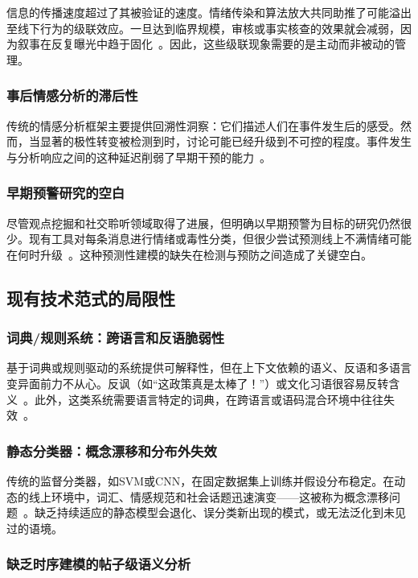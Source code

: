 \documentclass[conference]{IEEEtran}
\begin{document}
信息的传播速度超过了其被验证的速度。情绪传染和算法放大共同助推了可能溢出至线下行为的级联效应。一旦达到临界规模，审核或事实核查的效果就会减弱，因为叙事在反复曝光中趋于固化~\cite{Vosoughi2018}。因此，这些级联现象需要的是主动而非被动的管理。

\subsubsection{事后情感分析的滞后性}

传统的情感分析框架主要提供回溯性洞察：它们描述人们在事件发生后的感受。然而，当显著的极性转变被检测到时，讨论可能已经升级到不可控的程度。事件发生与分析响应之间的这种延迟削弱了早期干预的能力~\cite{Wang2020}。

\subsubsection{早期预警研究的空白}

尽管观点挖掘和社交聆听领域取得了进展，但明确以早期预警为目标的研究仍然很少。现有工具对每条消息进行情绪或毒性分类，但很少尝试预测线上不满情绪可能在何时升级~\cite{Wang2020}。这种预测性建模的缺失在检测与预防之间造成了关键空白。

\subsection{现有技术范式的局限性}

\subsubsection{词典/规则系统：跨语言和反语脆弱性}

基于词典或规则驱动的系统提供可解释性，但在上下文依赖的语义、反语和多语言变异面前力不从心。反讽（如“这政策真是太棒了！”）或文化习语很容易反转含义~\cite{Dhumpati2025}。此外，这类系统需要语言特定的词典，在跨语言或语码混合环境中往往失效~\cite{Kaity2020}。

\subsubsection{静态分类器：概念漂移和分布外失效}

传统的监督分类器，如SVM或CNN，在固定数据集上训练并假设分布稳定。在动态的线上环境中，词汇、情感规范和社会话题迅速演变——这被称为概念漂移问题~\cite{Gama2014}。缺乏持续适应的静态模型会退化、误分类新出现的模式，或无法泛化到未见过的语境。

\subsubsection{缺乏时序建模的帖子级语义分析}
\end{document}
